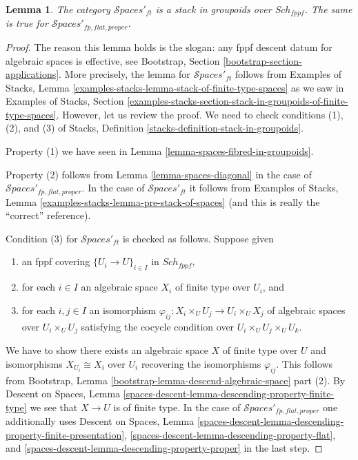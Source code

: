\documentclass{stacks-project}
\theoremstyle{plain}
\newtheorem{lemma}[subsection]{Lemma}
\theoremstyle{definition}
\theoremstyle{remark}
\numberwithin{equation}{subsection}
\def\Sch{\mathit{Sch}}
\def\Spacesstack{\mathcal{S}\!\mathit{paces}}
\begin{document}
\begin{lemma}
\label{lemma-spaces-stack}
The category $\Spacesstack'_{ft}$ is a stack in groupoids
over $\Sch_{fppf}$. The same is true for
$\Spacesstack'_{fp, flat, proper}$.
\end{lemma}

\begin{proof}
The reason this lemma holds is the slogan: any fppf descent datum for algebraic
spaces is effective, see Bootstrap, Section
\ref{bootstrap-section-applications}.
More precisely, the lemma for $\Spacesstack'_{ft}$ follows from
Examples of Stacks, Lemma
\ref{examples-stacks-lemma-stack-of-finite-type-spaces}
as we saw in Examples of Stacks, Section
\ref{examples-stacks-section-stack-in-groupoids-of-finite-type-spaces}.
However, let us review the proof. We need to check conditions
(1), (2), and (3) of Stacks, Definition
\ref{stacks-definition-stack-in-groupoids}.

\medskip\noindent
Property (1) we have seen in Lemma \ref{lemma-spaces-fibred-in-groupoids}.

\medskip\noindent
Property (2) follows from
Lemma \ref{lemma-spaces-diagonal} in the case of
$\Spacesstack'_{fp, flat, proper}$.
In the case of $\Spacesstack'_{ft}$ it follows
from Examples of Stacks, Lemma
\ref{examples-stacks-lemma-pre-stack-of-spaces}
(and this is really the ``correct'' reference).

\medskip\noindent
Condition (3) for $\Spacesstack'_{ft}$ is checked as follows. Suppose given
\begin{enumerate}
\item an fppf covering $\{U_i \to U\}_{i \in I}$ in $\Sch_{fppf}$,
\item for each $i \in I$ an algebraic space $X_i$ of finite type over
$U_i$, and
\item for each $i, j \in I$ an isomorphism
$\varphi_{ij} : X_i \times_U U_j \to U_i \times_U X_j$ of algebraic spaces
over $U_i \times_U U_j$ satisfying the cocycle condition over
$U_i \times_U U_j \times_U U_k$.
\end{enumerate}
We have to show there exists an algebraic space $X$ of finite type over $U$
and isomorphisms $X_{U_i} \cong X_i$ over $U_i$ recovering the
isomorphisms $\varphi_{ij}$. This follows from
Bootstrap, Lemma \ref{bootstrap-lemma-descend-algebraic-space} part (2).
By Descent on Spaces, Lemma
\ref{spaces-descent-lemma-descending-property-finite-type}
we see that $X \to U$ is of finite type.
In the case of $\Spacesstack'_{fp, flat, proper}$
one additionally uses
Descent on Spaces, Lemma
\ref{spaces-descent-lemma-descending-property-finite-presentation},
\ref{spaces-descent-lemma-descending-property-flat}, and
\ref{spaces-descent-lemma-descending-property-proper}
in the last step.
\end{proof}
\end{document}
